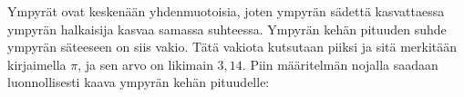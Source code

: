 Ympyrät ovat keskenään yhdenmuotoisia, joten ympyrän sädettä kasvattaessa ympyrän halkaisija kasvaa samassa suhteessa. Ympyrän kehän pituuden suhde ympyrän säteeseen on siis vakio. Tätä vakiota kutsutaan piiksi ja sitä merkitään kirjaimella $\pi$, ja sen arvo on likimain $3,14$. Piin määritelmän nojalla saadaan luonnollisesti kaava ympyrän kehän pituudelle:





